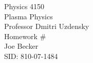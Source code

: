 \begin{titlepage}
\setlength{\topmargin}{1.5in}
\begin{center}
\Huge{Physics 4150} \\
\LARGE{Plasma Physics} \\
\Large{Professor Dmitri Uzdensky} \\[1cm]


\huge{Homework \#\HWnum}\\[0.5cm]

\large{Joe Becker} \\
\large{SID: 810-07-1484} \\
\large{\due} 

\end{center}

\end{titlepage}


